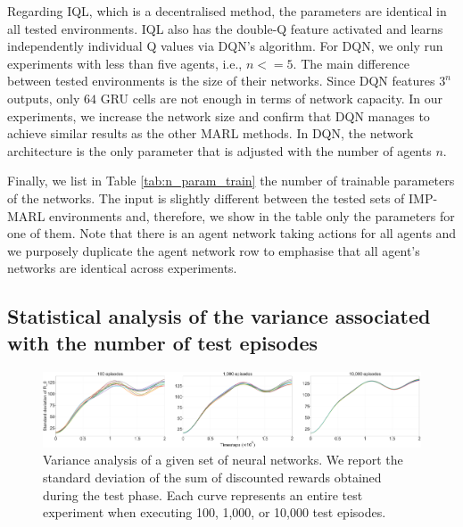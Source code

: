 Regarding IQL, which is a decentralised method, the parameters are identical in all tested environments.
IQL also has the double-Q feature activated and learns independently individual Q values via DQN's algorithm.
For DQN, we only run experiments with less than five agents, i.e., $n<=5$.
The main difference between tested environments is the size of their networks. 
Since DQN features $3^n$ outputs, only $64$ GRU cells are not enough in terms of network capacity. 
In our experiments, we increase the network size and confirm that DQN manages to achieve similar results as the other MARL methods.
In DQN, the network architecture is the only parameter that is adjusted with the number of agents $n$.

Finally, we list in Table \ref{tab:n_param_train} the number of trainable parameters of the networks.
The input is slightly different between the tested sets of IMP-MARL environments and, therefore, we show in the table only the parameters for one of them.
Note that there is an agent network taking actions for all agents and we purposely duplicate the agent network row to emphasise that all agent's networks are identical across experiments.





\subsection{Statistical analysis of the variance associated with the number of test episodes}
\label{sec:ch5_appendix_variance}

\begin{figure}
\centering
    \includegraphics[width=\textwidth]{tex_thesis/figures/ch5/variance_analysis.pdf}
\caption{
Variance analysis of a given set of neural networks.
We report the standard deviation of the sum of discounted rewards obtained during the test phase.
Each curve represents an entire test experiment when executing 100, 1,000, or 10,000 test episodes.
}
\label{fig:variance_details}
\end{figure}

